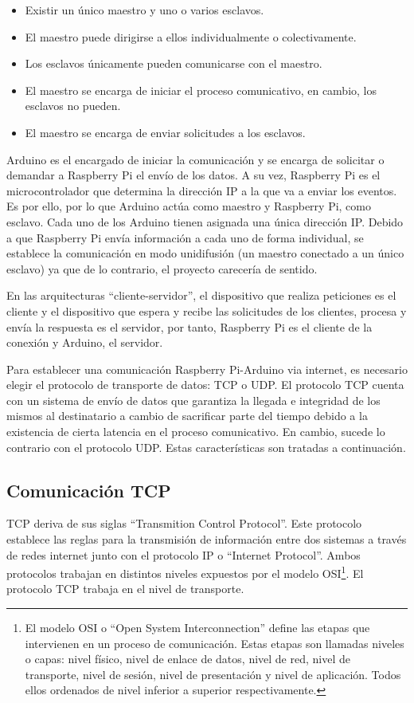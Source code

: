 \begin{itemize}
    \item Existir un único maestro y uno o varios esclavos.
    \item El maestro puede dirigirse a ellos individualmente o colectivamente.
    \item Los esclavos únicamente pueden comunicarse con el maestro.
    \item El maestro se encarga de iniciar el proceso comunicativo, en cambio, los esclavos no pueden.
    \item El maestro se encarga de enviar solicitudes a los esclavos.
\end{itemize}

Arduino es el encargado de iniciar la comunicación y se encarga de solicitar o demandar a Raspberry Pi el envío de los datos. A su vez, Raspberry Pi es el microcontrolador que determina la dirección IP a la que va a enviar los eventos. Es por ello, por lo que Arduino actúa como maestro y Raspberry Pi, como esclavo. Cada uno de los Arduino tienen asignada una única dirección IP. Debido a que Raspberry Pi envía información a cada uno de forma individual, se establece la comunicación en modo unidifusión (un maestro conectado a un único esclavo) ya que de lo contrario, el proyecto carecería de sentido.

En las arquitecturas ``cliente-servidor'', el dispositivo que realiza peticiones es el cliente y el dispositivo que espera y recibe las solicitudes de los clientes, procesa y envía la respuesta es el servidor, por tanto, Raspberry Pi es el cliente de la conexión y Arduino, el servidor.

Para establecer una comunicación Raspberry Pi-Arduino via internet, es necesario elegir el protocolo de transporte de datos: TCP o UDP. El protocolo TCP cuenta con un sistema de envío de datos que garantiza la llegada e integridad de los mismos al destinatario a cambio de sacrificar parte del tiempo debido a la existencia de cierta latencia en el proceso comunicativo. En cambio, sucede lo contrario con el protocolo UDP. Estas características son tratadas a continuación.


\subsection{Comunicación TCP} \label{s2_3_2}

TCP deriva de sus siglas ``Transmition Control Protocol''. Este protocolo establece las reglas para la transmisión de información entre dos sistemas a través de redes internet junto con el protocolo IP o ``Internet Protocol''. Ambos protocolos trabajan en distintos niveles expuestos por el modelo OSI\footnote{El modelo OSI o ``Open System Interconnection'' define las etapas que intervienen en un proceso de comunicación. Estas etapas son llamadas niveles o capas: nivel físico, nivel de enlace de datos, nivel de red, nivel de transporte, nivel de sesión, nivel de presentación y nivel de aplicación. Todos ellos ordenados de nivel inferior a superior respectivamente.}. El protocolo TCP trabaja en el nivel de transporte.

